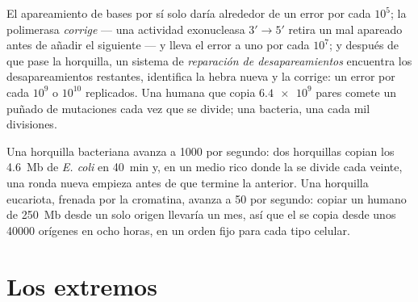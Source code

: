 \begin{proposition}[Fidelidad]\label{prop:b1:replication-mitosis:fidelity}
El apareamiento de bases por sí solo daría alrededor de un error por cada
$10^5$; la polimerasa \emph{corrige} --- una actividad exonucleasa
$3' \to 5'$ retira un  mal apareado antes de añadir el
siguiente --- y lleva el error a uno por cada $10^7$; y después de que pase
la horquilla, un sistema de \emph{reparación de desapareamientos} encuentra
los desapareamientos restantes, identifica la hebra nueva y la corrige: un
error por cada $10^9$ o $10^{10}$  replicados. Una 
humana que copia $\num{6.4e9}$ pares comete un puñado de mutaciones cada vez
que se divide; una bacteria, una cada mil divisiones.
\end{proposition}

\begin{example}\label{ex:b1:replication-mitosis:speed}
Una horquilla bacteriana avanza a \qty{1000}{}  por segundo:
dos horquillas copian los \qty{4.6}{Mb} de \emph{E. coli} en \qty{40}{min}
y, en un medio rico donde la  se divide cada veinte, una ronda nueva
empieza antes de que termine la anterior. Una horquilla eucariota, frenada
por la cromatina, avanza a \qty{50}{} por segundo: copiar un 
humano de \qty{250}{Mb} desde un solo origen llevaría un mes, así que el
 se copia desde unos \num{40000} orígenes en ocho horas, en un orden
fijo para cada tipo celular.
\end{example}

\section{Los extremos}

